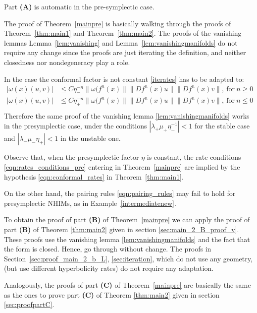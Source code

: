 \documentclass[11pt]{amsart}
\theoremstyle{definition}
\theoremstyle{remark}
\numberwithin{equation}{section}
\begin{document}
Part \textbf{(A)}  is automatic in the pre-symplectic case.

The proof of Theorem~\ref{mainpre} is basically walking through the proofs of
Theorem~\ref{thm:main1} and Theorem~\ref{thm:main2}.
The proofs of the vanishing lemmas Lemma~\ref{lem:vanishing} and Lemma~\ref{lem:vanishingmanifolds} do not require any change since the proofs are just iterating the definition, and neither closedness
nor nondegeneracy play a role.


In the case the conformal factor is not constant  \eqref{iterates} has to be adapted to:
\begin{equation}\label{newiterates}
\begin{split}
|\omega(x) (u,v)| &\le C\eta_-^{-n} \| \omega (f^n(x)\| \|Df^n(x) u\| \|Df^n(x) v\|, \ \text{for} \ n\ge 0\\
|\omega(x) (u,v)| &\le C\eta_+^{-n} \| \omega (f^n(x)\| \|Df^n(x) u\| \|Df^n(x) v\|, \ \text{for} \ n\le 0\\
\end{split}
\end{equation}
Therefore the same proof of the vanishing lemma \ref{lem:vanishingmanifolds} works in the presymplectic case, under the conditions
$|\lambda_+\mu_+\eta_-^{-1} |< 1$ for the stable case and $|\lambda_-\mu_-\eta_+|<1$ in the unstable one.


Observe that, when the presymplectic factor $\eta$ is constant,
the rate  conditions  \eqref{eqn:rates_conditions_pre} entering in Theorem~\ref{mainpre} are
implied by the hypothesis \eqref{eqn:conformal_rates}  in Theorem~\ref{thm:main1}.

On the other hand, the pairing rules \eqref{eqn:pairing_rules} may
fail to hold for presymplectic  NHIMs,
as in Example~\ref{intermediatenew}.



To obtain the  proof of part \textbf{(B)} of Theorem~\ref{mainpre}
we can apply the proof  of part \textbf{(B)} of  Theorem \ref{thm:main2} given in section \ref{sec:main_2_B_proof_v}.
These proofs use the vanishing lemma \ref{lem:vanishingmanifolds} and the fact that the form is closed.
Hence, go through without change.
The proofs in Section~\ref{sec:proof_main_2_b_L}, \ref{sec:iteration}, which do not use any geometry,
(but use different hyperbolicity rates) do not require any adaptation.

Analogously, the proofs of part \textbf{(C)} of Theorem~\ref{mainpre} are basically the same as the ones to prove part \textbf{(C)} of  Theorem \ref{thm:main2} given in section \ref{sec:proofpartC}.
\end{document}
